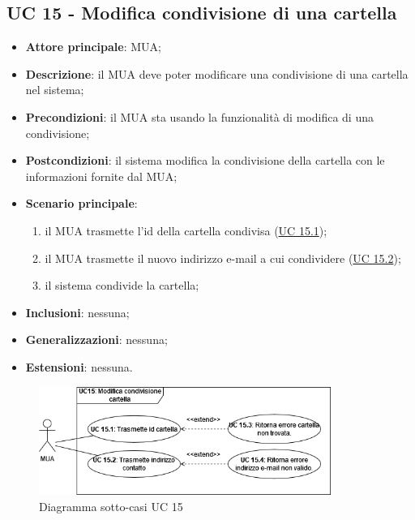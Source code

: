 \subsection{UC 15 - Modifica condivisione di una cartella} \label{sec:UC15}

    \begin{itemize}
        \item \textbf{Attore principale}: MUA;
        \item \textbf{Descrizione}: il MUA deve poter modificare una condivisione di una cartella nel sistema;
        \item \textbf{Precondizioni}: il MUA sta usando la funzionalità di modifica di una condivisione;
        \item \textbf{Postcondizioni}: il sistema modifica la condivisione della cartella con le informazioni fornite dal MUA;
        \item \textbf{Scenario principale}:
            \begin{enumerate}
                \item il MUA trasmette l'id della cartella condivisa (\hyperref[sec:UC15.1]{UC 15.1});
                \item il MUA trasmette il nuovo indirizzo e-mail a cui condividere (\hyperref[sec:UC15.2]{UC 15.2});
                \item il sistema condivide la cartella;
            \end{enumerate}
        \item \textbf{Inclusioni}: nessuna;
        \item \textbf{Generalizzazioni}: nessuna;
        \item \textbf{Estensioni}: nessuna.
    \end{itemize}

    \begin{figure}[H]
        \includegraphics[width=0.85\textwidth]{sections/uc_imgs/UC15.png}
        \centering
        \caption{Diagramma sotto-casi UC 15}
    \end{figure}

